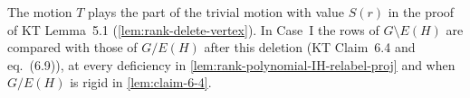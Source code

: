 The motion $T$ plays the part of the trivial motion with value $S(r)$ in
the proof of KT Lemma~5.1 (\cref{lem:rank-delete-vertex}). In Case~I the
rows of $G \setminus E(H)$ are compared with those of $G/E(H)$ after this
deletion (KT Claim~6.4 and eq.~(6.9)), at every deficiency in
\cref{lem:rank-polynomial-IH-relabel-proj} and when $G/E(H)$ is rigid in
\cref{lem:claim-6-4}.
